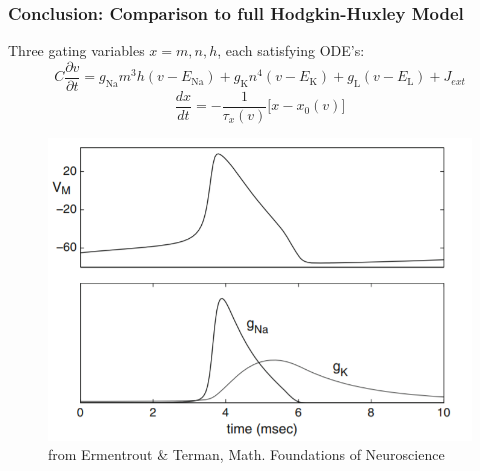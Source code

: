 \documentclass{beamer}
\begin{document}
\begin{frame}
\frametitle{Conclusion: Comparison to full Hodgkin-Huxley Model} 
\hfill \break
Three gating variables $x = m,n,h$, each satisfying ODE's:
$$ C\frac{\partial{v}}{\partial{t}} = g_{\text{Na}}m^3h(v-E_{\text{Na}})+g_{\text{K}}n^4(v-E_{\text{K}})+g_{\text{L}}(v-E_\text{L}) + J_{ext}$$
$$ \frac{dx}{dt} = -\frac{1}{\tau_x(v)}\big[x-x_0(v)\big] $$
\begin{figure}
	\includegraphics[scale=0.4]{conc/sol}
	\caption{from Ermentrout \& Terman, Math. Foundations of Neuroscience}
\end{figure}
\end{frame}
\end{document}
